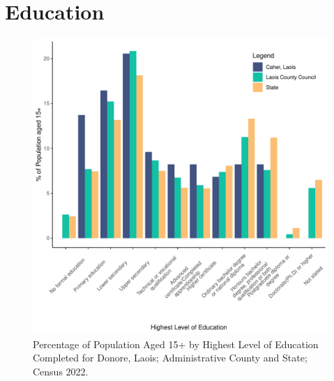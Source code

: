 \documentclass{article}
\begin{document}
\section{Education}\label{sect:Edu}
\begin{figure}[H]
	\centering
	\includegraphics[width = 120mm]{../figures/EduED.pdf}
	\caption{Percentage of Population Aged 15+ by Highest Level of Education Completed for Donore, Laois; Administrative County and State; Census 2022.}
	\label{fig:vbnv}
	\end{figure}
\end{document}
